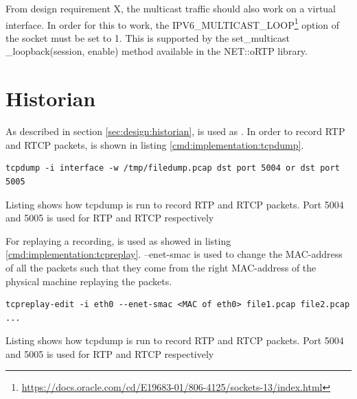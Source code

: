 \noindent{}From design requirement X, the multicast traffic should also work on a virtual interface. In order for this to work, the IPV6\_MULTICAST\_LOOP\footnote{\url{https://docs.oracle.com/cd/E19683-01/806-4125/sockets-13/index.html}} option of the socket must be set to 1. This is supported by the set\_multicast \_loopback(session, enable) method available in the NET::oRTP library.



\section{Historian}
As described in section \ref{sec:design:historian},  is used as \hist{}.
In order to record RTP and RTCP packets,  is shown in listing \ref{cmd:implementation:tcpdump}.
\begin{listing}[h] 
\begin{verbatim}
tcpdump -i interface -w /tmp/filedump.pcap dst port 5004 or dst port 5005 
\end{verbatim}
\caption{Listing shows how tcpdump is run to record RTP and RTCP packets. Port 5004 and 5005 is used for RTP and RTCP respectively}
\label{cmd:implementation:tcpdump}
\end{listing}


For replaying a recording,  is used as showed in listing \ref{cmd:implementation:tcpreplay}. --enet-smac is used to change the MAC-address of all the packets such that they come from the right MAC-address of the physical machine replaying the packets.
\begin{listing}[h] 
	\begin{verbatim}
tcpreplay-edit -i eth0 --enet-smac <MAC of eth0> file1.pcap file2.pcap ...
	\end{verbatim}
\caption{Listing shows how tcpdump is run to record RTP and RTCP packets. Port 5004 and 5005 is used for RTP and RTCP respectively}
\label{cmd:implementation:tcpreplay}
\end{listing}

